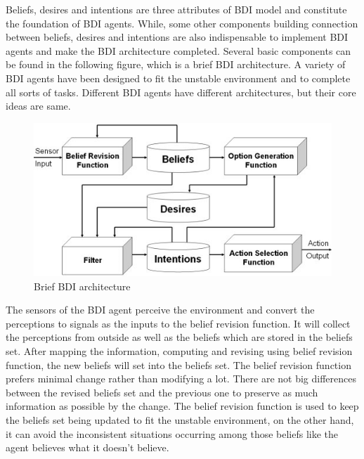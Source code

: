 Beliefs, desires and intentions are three attributes of BDI model and constitute the foundation of BDI agents. While, some other components building connection between beliefs, desires and intentions are also indispensable to implement BDI agents and make the BDI architecture completed.
Several basic components can be found in the following figure, which is a brief BDI architecture. A variety of BDI agents have been designed to fit the unstable environment and to complete all sorts of tasks. Different BDI agents have different architectures, but their core ideas are same.

\begin{figure}[htbp]
  \centering
  \includegraphics[width=\textwidth]{images/BDIAr}
  \caption{Brief BDI architecture \cite{BDIA}}%
  \label{fig:Brief BDI architecture}
\end{figure}

The sensors of the BDI agent perceive the environment and convert the perceptions to signals as the inputs to the belief revision function. It will collect the perceptions from outside as well as the beliefs which are stored in the beliefs set. After mapping the information, computing and revising using belief revision function, the new beliefs will set into the beliefs set. The belief revision function prefers minimal change rather than modifying a lot. There are not big differences between the revised beliefs set and the previous one to preserve as much information as possible by the change\cite{M_Belief}. The belief revision function is used to keep the beliefs set being updated to fit the unstable environment, on the other hand, it can avoid the inconsistent situations occurring among those beliefs like the agent believes what it doesn't believe.


